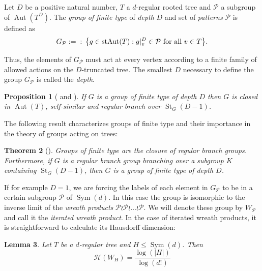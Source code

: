 \documentclass{amsart}
\def\set#1{{\def\st{\;:\;}\left\{#1\right\}}}
\def\abs#1{\left\vert{#1}\right\vert}
\DeclareMathOperator{\Aut}{Aut}
\DeclareMathOperator{\St}{St}
\DeclareMathOperator{\Sym}{Sym}
\DeclareMathOperator{\st}{st}
\newtheorem{Proposition}{Proposition}[section]
\newtheorem{Lemma}[Proposition]{Lemma}
\newtheorem{theorem}[Proposition]{Theorem}
\begin{document}
Let $D$ be a positive natural number, $T$ a $d$-regular rooted tree and $\mathcal{P}$ a subgroup of $\Aut(T^D)$. The \textit{group of finite type} of \textit{depth} $D$ and set of \textit{patterns} $\mathcal{P}$ is defined as 
\begin{equation}
G_\mathcal{P} := \set{g \in \Aut(T): g|_v^D \in \mathcal{P} \text{ for all $v \in T$}}.
\label{equation: finite type definition}
\end{equation}

Thus, the elements of $G_\mathcal{P}$ must act at every vertex according to a finite family of allowed actions on the $D$-truncated tree. The smallest $D$ necessary to define the group $G_\mathcal{P}$ is called the \textit{depth}.

\begin{Proposition}[{\cite[page 3]{Bondarenko2014} and \cite[Proposition 7.5]{Grigorchuk2005}}]
If $G$ is a group of finite type of depth $D$ then $G$ is closed in $\Aut(T)$, self-similar and regular branch over $\St_G(D-1)$.
\label{proposition: finite type is closed self-similar and regular branch}
\end{Proposition}

The following result characterizes groups of finite type and their importance in the theory of groups acting on trees:

\begin{theorem}[{\cite[Theorem 3]{Sunic2010}}]
Groups of finite type are the closure of regular branch groups. Furthermore, if $G$ is a regular branch group branching over a subgroup $K$ containing $\St_G(D-1)$, then $\overline{G}$ is a group of finite type of depth $D$.
\label{theorem: characterization finite type groups}
\end{theorem}

If for example $D = 1$, we are forcing the labels of each element in $G_\mathcal{P}$ to be in a certain subgroup $\mathcal{P}$ of $\Sym(d)$. In this case the group is isomorphic to the inverse limit of the \textit{wreath products} $\mathcal{P} \wr \mathcal{P} \wr \dots \wr \mathcal{P}$. We will denote these group by $W_\mathcal{P}$ and call it the \textit{iterated wreath product}. In the case of iterated wreath products, it is straightforward to calculate its Hausdorff dimension: 

\begin{Lemma}
\label{lemma: Hausdorff dimension iterated wreath product}
Let $T$ be a $d$-regular tree and $H \leq \Sym(d)$. Then $$\mathcal{H}(W_H) = \frac{\log(\abs{H})}{\log(d!)}$$
\end{Lemma}
\end{document}
